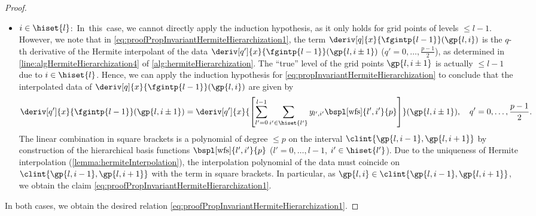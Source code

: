 \begin{proof}
\begin{itemize}
    \item
    \mbox{${i \in \hiset{l}}$: In this case,}
    we cannot directly apply the induction hypothesis,
    as it only holds for grid points of levels $\le l - 1$.
    However, we note that in
    \eqref{eq:proofPropInvariantHermiteHierarchization1},
    the term $\deriv[q]{x}{\fgintp{l-1}}(\gp{l,i})$
    is the $q$-th derivative of the Hermite interpolant of
    the data $\deriv[q']{x}{\fgintp{l-1}}(\gp{l,i\pm1})$
    ($q' = 0, \dotsc, \frac{p-1}{2}$),
    as determined in \cref{line:algHermiteHierarchization4}
    of \cref{alg:hermiteHierarchization}.
    The ``true'' level of the grid points $\gp{l,i\pm1}$ is
    actually $\le l - 1$ due to $i \in \hiset{l}$.
    Hence, we can apply the induction hypothesis
    for \cref{eq:propInvariantHermiteHierarchization}
    to conclude that the interpolated data of
    $\deriv[q]{x}{\fgintp{l-1}}(\gp{l,i})$ are given by
    \begin{equation}
      \deriv[q']{x}{\fgintp{l-1}}(\gp{l,i\pm1})
      = \deriv[q']{x}{
        \bracket*{
          \sum_{l'=0}^{l-1} \sum_{i' \in \hiset{l'}}
          \linout{l',i'} \bspl[\wfs]{l',i'}{p}
        }
      }(\gp{l,i\pm1}),\quad
      q' = 0, \dotsc, \frac{p-1}{2}.
    \end{equation}
    The linear combination in square brackets
    is a polynomial of degree $\le p$ on the interval
    $\clint{\gp{l,i-1}, \gp{l,i+1}}$
    by construction of the hierarchical basis functions
    $\bspl[\wfs]{l',i'}{p}$ ($l' = 0, \dotsc, l - 1$, $i' \in \hiset{l'}$).
    Due to the uniqueness of Hermite interpolation
    (\cref{lemma:hermiteInterpolation}),
    the interpolation polynomial of the data must
    coincide on $\clint{\gp{l,i-1}, \gp{l,i+1}}$
    with the term in square brackets.
    In particular, as $\gp{l,i} \in \clint{\gp{l,i-1}, \gp{l,i+1}}$,
    we obtain the claim \eqref{eq:proofPropInvariantHermiteHierarchization1}.
  \end{itemize}
  In both cases, we obtain the desired relation
  \eqref{eq:proofPropInvariantHermiteHierarchization1}.
\end{proof}


